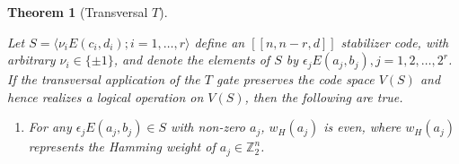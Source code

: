 \documentclass[twoside,romanappendices]{IEEEtran}
\newtheorem{theorem}{Theorem}
\newcommand{\syminn}[2]{\langle #1, #2 \rangle_{\text{s}}}
\newcommand{\llbr}{[\![}
\newcommand{\rrbr}{]\!]}
\begin{document}
\begin{theorem}[Transversal $T$]
\label{thm:transversal_T}


      

% 
Let $S = \langle \nu_i E(c_i,d_i) ; i = 1,\ldots,r \rangle$ define an $\llbr n,n-r,d \rrbr$ stabilizer code, with arbitrary $\nu_i \in \{ \pm 1 \}$, and denote the elements of $S$ by $\epsilon_j E(a_j, b_j), j = 1,2,\ldots,2^r$. %
If the transversal application of the $T$ gate  preserves the code space $V(S)$ and hence realizes a logical operation on $V(S)$, then the following are true.
\begin{enumerate}

\item For any $\epsilon_j E(a_j,b_j) \in S$ with non-zero $a_j$, $w_H(a_j)$ is even, where $w_H(a_j)$ represents the Hamming weight of $a_j \in \mathbb{Z}_2^n$.


\end{enumerate}
\end{theorem}
\end{document}
